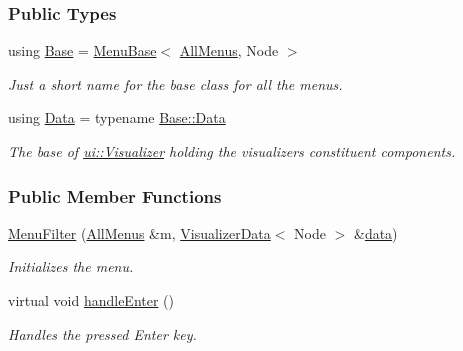 \subsubsection*{Public Types}
\begin{DoxyCompactItemize}
\item 
using \hyperlink{structslb_1_1core_1_1ui_1_1MenuFilter_a3f5f2bc7e487bf036f490e4ee3751182}{Base} = \hyperlink{structslb_1_1core_1_1ui_1_1MenuBase}{Menu\+Base}$<$ \hyperlink{structslb_1_1core_1_1ui_1_1AllMenus}{All\+Menus}, Node $>$\hypertarget{structslb_1_1core_1_1ui_1_1MenuFilter_a3f5f2bc7e487bf036f490e4ee3751182}{}\label{structslb_1_1core_1_1ui_1_1MenuFilter_a3f5f2bc7e487bf036f490e4ee3751182}

\begin{DoxyCompactList}\small\item\em Just a short name for the base class for all the menus. \end{DoxyCompactList}\item 
using \hyperlink{structslb_1_1core_1_1ui_1_1MenuFilter_a9390aaf5ebb13312c7719d028ea17dd2}{Data} = typename \hyperlink{structslb_1_1core_1_1ui_1_1MenuBase_a1803444111552d2e5b87671292dd74cb}{Base\+::\+Data}\hypertarget{structslb_1_1core_1_1ui_1_1MenuFilter_a9390aaf5ebb13312c7719d028ea17dd2}{}\label{structslb_1_1core_1_1ui_1_1MenuFilter_a9390aaf5ebb13312c7719d028ea17dd2}

\begin{DoxyCompactList}\small\item\em The base of \hyperlink{structslb_1_1core_1_1ui_1_1Visualizer}{ui\+::\+Visualizer} holding the visualizer\textquotesingle{}s constituent components. \end{DoxyCompactList}\end{DoxyCompactItemize}
\subsubsection*{Public Member Functions}
\begin{DoxyCompactItemize}
\item 
\hyperlink{structslb_1_1core_1_1ui_1_1MenuFilter_a221327f43056547ffea2a742b2d71c69}{Menu\+Filter} (\hyperlink{structslb_1_1core_1_1ui_1_1AllMenus}{All\+Menus} \&m, \hyperlink{structslb_1_1core_1_1ui_1_1VisualizerData}{Visualizer\+Data}$<$ Node $>$ \&\hyperlink{structslb_1_1core_1_1ui_1_1MenuBase_a475d9457affb2b4fc96737e269d6911f}{data})
\begin{DoxyCompactList}\small\item\em Initializes the menu. \end{DoxyCompactList}\item 
virtual void \hyperlink{structslb_1_1core_1_1ui_1_1MenuFilter_aac542862e11743e1f1bbe55462936ed1}{handle\+Enter} ()\hypertarget{structslb_1_1core_1_1ui_1_1MenuFilter_aac542862e11743e1f1bbe55462936ed1}{}\label{structslb_1_1core_1_1ui_1_1MenuFilter_aac542862e11743e1f1bbe55462936ed1}

\begin{DoxyCompactList}\small\item\em Handles the pressed Enter key. \end{DoxyCompactList}\end{DoxyCompactItemize}
